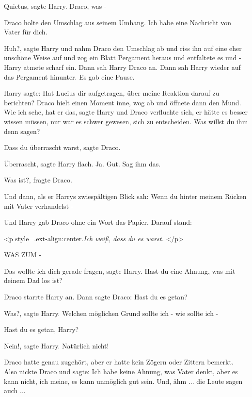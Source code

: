 \glqq Quietus\grqq{}, sagte Harry. \glqq Draco, was -\grqq{}

Draco holte den Umschlag aus seinem Umhang. \glqq Ich habe eine Nachricht von
Vater für dich.\grqq{}

\glqq Huh?\grqq{}, sagte Harry und nahm Draco den Umschlag ab und riss ihn auf
eine eher unschöne Weise auf und zog ein Blatt Pergament heraus und entfaltete
es und - Harry atmete scharf ein. Dann sah Harry Draco an. Dann sah Harry wieder
auf das Pergament hinunter. Es gab eine Pause.

Harry sagte: \glqq Hat Lucius dir aufgetragen, über meine Reaktion darauf zu
berichten?\grqq{} Draco hielt einen Moment inne, wog ab und öffnete dann den
Mund. \glqq Wie ich sehe, hat er das\grqq{}, sagte Harry und Draco verfluchte
sich, er hätte es besser wissen müssen, nur war es schwer gewesen, sich zu
entscheiden. \glqq Was willst du ihm denn sagen?\grqq{}

\glqq Dass du überrascht warst\grqq{}, sagte Draco.

\glqq Überrascht\grqq{}, sagte Harry flach. \glqq Ja. Gut. Sag ihm das.\grqq{}

\glqq Was ist?\grqq{}, fragte Draco.

Und dann, als er Harrys zwiespältigen Blick sah: \glqq Wenn du hinter meinem
Rücken mit Vater verhandelst -\grqq{}

Und Harry gab Draco ohne ein Wort das Papier. Darauf stand:

<p style=\grqq{}.ext-align:center\grqq{}.\emph{Ich weiß, dass du es warst.} </p>

\glqq WAS ZUM -\grqq{}

\glqq Das wollte ich dich gerade fragen\grqq{}, sagte Harry. \glqq Hast du eine
Ahnung, was mit deinem Dad los ist?\grqq{}

Draco starrte Harry an. Dann sagte Draco: \glqq Hast du es getan?\grqq{}

\glqq Was?\grqq{}, sagte Harry. \glqq Welchen möglichen Grund sollte ich - wie
sollte ich -\grqq{}

\glqq Hast du es getan, Harry?\grqq{}

\glqq Nein!\grqq{}, sagte Harry. \glqq Natürlich nicht!\grqq{}

Draco hatte genau zugehört, aber er hatte kein Zögern oder Zittern bemerkt. Also
nickte Draco und sagte: \glqq Ich habe keine Ahnung, was Vater denkt, aber es
kann nicht, ich meine, es kann unmöglich gut sein. Und, ähm ... die Leute sagen
auch ...\grqq{}

